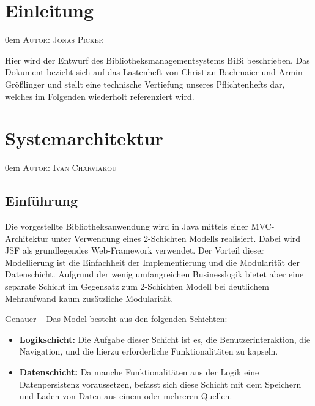 \documentclass{article}
\makeatletter
\newcommand{\sectionauthor}[1]{
	{\parindent 0em \large \scshape Autor: #1 \par \nobreak \vspace*{1em}}
	\@afterheading
}
\makeatother
\begin{document}
\section{Einleitung}
\sectionauthor{Jonas Picker}
Hier wird der Entwurf des Bibliotheksmanagementsystems BiBi beschrieben. Das Dokument bezieht sich auf das Lastenheft von Christian Bachmaier und Armin Größlinger und stellt eine technische Vertiefung unseres Pflichtenhefts dar, welches im Folgenden wiederholt referenziert wird.

\section{Systemarchitektur}
\sectionauthor{Ivan Charviakou}



\subsection{Einführung}

Die vorgestellte Bibliotheksanwendung wird in Java mittels einer MVC-Architektur unter Verwendung eines 2-Schichten Modells realisiert. Dabei wird JSF als grundlegendes Web-Framework verwendet. Der Vorteil dieser Modellierung ist die Einfachheit der Implementierung und die Modularität der Datenschicht. Aufgrund der wenig umfangreichen Businesslogik bietet aber eine separate Schicht im Gegensatz zum 2-Schichten Modell bei deutlichem Mehraufwand kaum zusätzliche Modularität. \vspace{0.5em}

Genauer – Das Model besteht aus den folgenden Schichten:
\begin{itemize}
	\item \textbf{Logikschicht:} Die Aufgabe dieser Schicht ist es, die Benutzerinteraktion, die Navigation, und die hierzu erforderliche Funktionalitäten zu kapseln.
	\item \textbf{Datenschicht:} Da manche Funktionalitäten aus der Logik eine Datenpersistenz voraussetzen, befasst sich diese Schicht mit dem Speichern und Laden von Daten aus einem oder mehreren Quellen.
\end{itemize}
\end{document}
